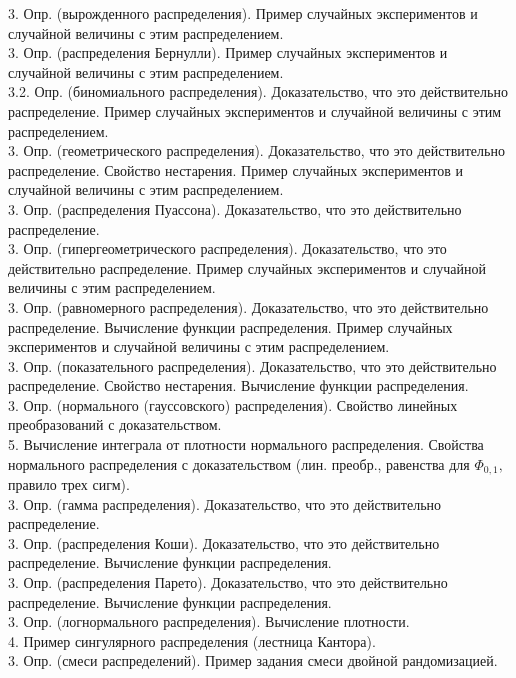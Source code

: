 \documentclass[10pt]{amsart}
\begin{document}
\begin{enumerate}
\begin{enumerate}
3. Опр. (вырожденного распределения). Пример случайных экспериментов и случайной величины с этим распределением. \\
3. Опр. (распределения Бернулли).  Пример случайных экспериментов и случайной величины с этим распределением. \\
3.2. Опр. (биномиального распределения). Доказательство, что это действительно распределение. Пример случайных экспериментов и случайной величины с этим распределением. \\     
3. Опр. (геометрического распределения). Доказательство, что это действительно распределение. Свойство нестарения. Пример случайных экспериментов и случайной величины с этим распределением. \\      
3. Опр. (распределения Пуассона). Доказательство, что это действительно распределение. \\
3. Опр. (гипергеометрического распределения). Доказательство, что это действительно распределение. Пример случайных экспериментов и случайной величины с этим распределением. \\      
3. Опр. (равномерного распределения). Доказательство, что это действительно распределение. Вычисление функции распределения. Пример случайных экспериментов и случайной величины с этим распределением. \\
3. Опр. (показательного распределения). Доказательство, что это действительно распределение. Свойство нестарения. Вычисление функции распределения. \\  
3. Опр. (нормального (гауссовского) распределения). Свойство линейных преобразований с доказательством. \\
5. Вычисление интеграла от плотности нормального распределения.  Свойства нормального распределения с доказательством (лин. преобр., равенства для $\Phi_{0,1},$ правило трех сигм). \\
3. Опр. (гамма распределения). Доказательство, что это действительно распределение. \\
3. Опр. (распределения Коши). Доказательство, что это действительно распределение. Вычисление функции распределения. \\
3. Опр. (распределения Парето). Доказательство, что это действительно распределение. Вычисление функции распределения. \\
3. Опр. (логнормального распределения). Вычисление плотности. \\
4. Пример сингулярного распределения (лестница Кантора). \\
3. Опр. (смеси распределений). Пример задания смеси двойной рандомизацией. \\


\end{enumerate}
\end{enumerate}
\end{document}
